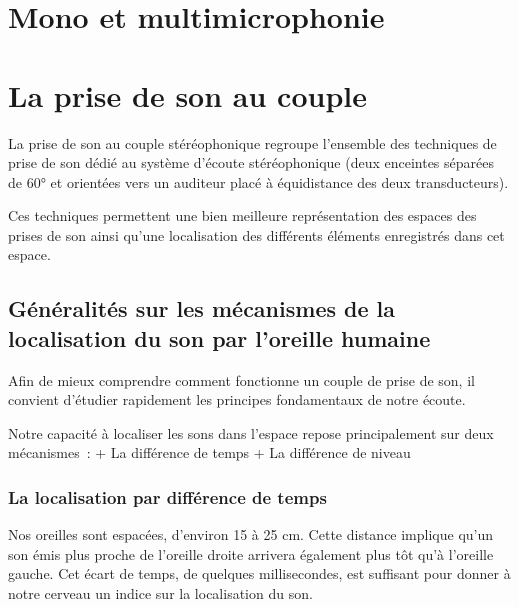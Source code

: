 \documentclass[
]{book}
\begin{document}
\hypertarget{mono-et-multimicrophonie}{%
\chapter{Mono et multimicrophonie}\label{mono-et-multimicrophonie}}

\hypertarget{la-prise-de-son-au-couple}{%
\chapter{La prise de son au couple}\label{la-prise-de-son-au-couple}}

La prise de son au couple stéréophonique regroupe l'ensemble des techniques de prise de son dédié au système d'écoute stéréophonique (deux enceintes séparées de 60° et orientées vers un auditeur placé à équidistance des deux transducteurs).

Ces techniques permettent une bien meilleure représentation des espaces des prises de son ainsi qu'une localisation des différents éléments enregistrés dans cet espace.

\hypertarget{guxe9nuxe9ralituxe9s-sur-les-muxe9canismes-de-la-localisation-du-son-par-loreille-humaine}{%
\section{Généralités sur les mécanismes de la localisation du son par l'oreille humaine}\label{guxe9nuxe9ralituxe9s-sur-les-muxe9canismes-de-la-localisation-du-son-par-loreille-humaine}}

Afin de mieux comprendre comment fonctionne un couple de prise de son, il convient d'étudier rapidement les principes fondamentaux de notre écoute.

Notre capacité à localiser les sons dans l'espace repose principalement sur deux mécanismes~:
+ La différence de temps
+ La différence de niveau

\hypertarget{la-localisation-par-diffuxe9rence-de-temps}{%
\subsection{La localisation par différence de temps}\label{la-localisation-par-diffuxe9rence-de-temps}}

Nos oreilles sont espacées, d'environ 15 à 25 cm. Cette distance implique qu'un son émis plus proche de l'oreille droite arrivera également plus tôt qu'à l'oreille gauche. Cet écart de temps, de quelques millisecondes, est suffisant pour donner à notre cerveau un indice sur la localisation du son.
\end{document}
